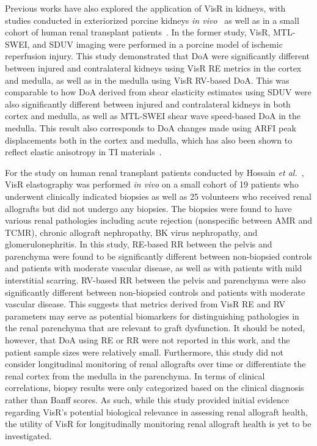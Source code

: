 
Previous works have also explored the application of VisR in kidneys, with studies conducted in exteriorized porcine kidneys \emph{in vivo}~\cite{hossain_Viscoelastic_2018} as well as in a small cohort of human renal transplant patients~\cite{hossain_Evaluating_2018}. In the former study, VisR, MTL-SWEI, and SDUV imaging were performed in a porcine model of ischemic reperfusion injury. This study demonstrated that DoA were significantly different between injured and contralateral kidneys using VisR RE metrics in the cortex and medulla, as well as in the medulla using VisR RV-based DoA. This was comparable to how DoA derived from shear elasticity estimates using SDUV were also significantly different between injured and contralateral kidneys in both cortex and medulla, as well as MTL-SWEI shear wave speed-based DoA in the medulla. This result also corresponds to DoA changes made using ARFI peak displacements both in the cortex and medulla, which has also been shown to reflect elastic anisotropy in TI materials~\cite{hossain_Acoustic_2017,hossain_Quantitative_2022}.

For the study on human renal transplant patients conducted by Hossain \emph{et al.}~\cite{hossain_Evaluating_2018}, VisR elastography was performed \emph{in vivo} on a small cohort of 19 patients who underwent clinically indicated biopsies as well as 25 volunteers who received renal allografts but did not undergo any biopsies. The biopsies were found to have various renal pathologies including acute rejection (nonspecific between AMR and TCMR), chronic allograft nephropathy, BK virus nephropathy, and glomerulonephritis. In this study, RE-based RR between the pelvis and parenchyma were found to be significantly different between non-biopsied controls and patients with moderate vascular disease, as well as with patients with mild interstitial scarring. RV-based RR between the pelvis and parenchyma were also significantly different between non-biopsied controls and patients with moderate vascular disease. This suggests that metrics derived from VisR RE and RV parameters may serve as potential biomarkers for distinguishing pathologies in the renal parenchyma that are relevant to graft dysfunction. It should be noted, however, that DoA using RE or RR were not reported in this work, and the patient sample sizes were relatively small. Furthermore, this study did not consider longitudinal monitoring of renal allografts over time or differentiate the renal cortex from the medulla in the parenchyma. In terms of clinical correlations, biopsy results were only categorized based on the clinical diagnosis rather than Banff scores. As such, while this study provided initial evidence regarding VisR's potential biological relevance in assessing renal allograft health, the utility of VisR for longitudinally monitoring renal allograft health is yet to be investigated.

